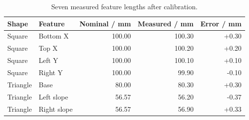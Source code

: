 \begin{table}[!htbp]\centering\small
\begin{tabular}{llrrr}\toprule
\textbf{Shape} & \textbf{Feature} & \textbf{Nominal / mm} & \textbf{Measured / mm} & \textbf{Error / mm}\\\midrule
Square & Bottom X & 100.00 & 100.30 & +0.30\\
Square & Top X & 100.00 & 100.20 & +0.20\\
Square & Left Y & 100.00 & 100.10 & +0.10\\
Square & Right Y & 100.00 & 99.90 & -0.10\\
Triangle & Base & 80.00 & 80.30 & +0.30\\
Triangle & Left slope & 56.57 & 56.20 & -0.37\\
Triangle & Right slope & 56.57 & 56.90 & +0.33\\
\bottomrule\end{tabular}
\caption{Seven measured feature lengths after calibration.}\label{tab:res-r5-lengths}
\end{table}
